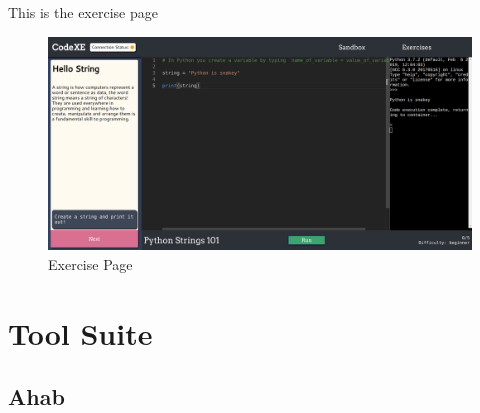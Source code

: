 This is the exercise page

\begin{figure}[h!]
    \centering
    \includegraphics[width=\linewidth]{res/exercise_page.png}
    \caption{Exercise Page}
    \label{fig:exercisepage}
\end{figure}

\section{Tool Suite}

\subsection{Ahab}

\pagebreak
